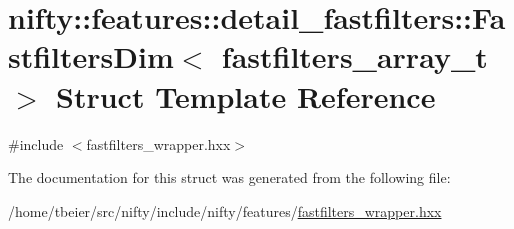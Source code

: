 \hypertarget{structnifty_1_1features_1_1detail__fastfilters_1_1FastfiltersDim}{}\section{nifty\+:\+:features\+:\+:detail\+\_\+fastfilters\+:\+:Fastfilters\+Dim$<$ fastfilters\+\_\+array\+\_\+t $>$ Struct Template Reference}
\label{structnifty_1_1features_1_1detail__fastfilters_1_1FastfiltersDim}


{\ttfamily \#include $<$fastfilters\+\_\+wrapper.\+hxx$>$}



The documentation for this struct was generated from the following file\+:\begin{DoxyCompactItemize}
\item 
/home/tbeier/src/nifty/include/nifty/features/\hyperlink{fastfilters__wrapper_8hxx}{fastfilters\+\_\+wrapper.\+hxx}\end{DoxyCompactItemize}
